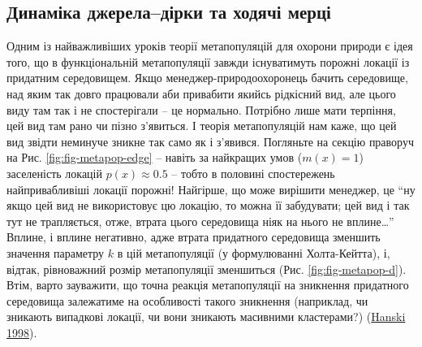 \documentclass[
  11pt,
]{book}
\begin{document}
\subsection{Динаміка джерела--дірки та ходячі мерці}\label{ux434ux438ux43dux430ux43cux456ux43aux430-ux434ux436ux435ux440ux435ux43bux430ux434ux456ux440ux43aux438-ux442ux430-ux445ux43eux434ux44fux447ux456-ux43cux435ux440ux446ux456}

Одним із найважливіших уроків теорії метапопуляцій для охорони природи є ідея того, що в функціональній метапопуляції завжди існуватимуть порожні локації із придатним середовищем. Якщо менеджер-природоохоронець бачить середовище, над яким так довго працювали аби привабити якийсь рідкісний вид, але цього виду там так і не спостерігали -- це нормально. Потрібно лише мати терпіння, цей вид там рано чи пізно з'явиться. І теорія метапопуляцій нам каже, що цей вид звідти неминуче зникне так само як і з'явився. Погляньте на секцію праворуч на Рис. \ref{fig:fig-metapop-edge} -- навіть за найкращих умов (\(m(x) = 1\)) заселеність локацій \(p(x) \approx 0.5\) -- тобто в половині спостережень найпривабливіші локації порожні! Найгірше, що може вирішити менеджер, це ``ну якщо цей вид не використовує цю локацію, то можна її забудувати; цей вид і так тут не трапляється, отже, втрата цього середовища ніяк на нього не вплине\ldots{}'' Вплине, і вплине негативно, адже втрата придатного середовища зменшить значення параметру \(k\) в цій метапопуляції (у формулюванні Холта-Кейтта), і, відтак, рівноважний розмір метапопуляції зменшиться (Рис. \ref{fig:fig-metapop-d}). Втім, варто зауважити, що точна реакція метапопуляції на зникнення придатного середовища залежатиме на особливості такого зникнення (наприклад, чи зникають випадкові локації, чи вони зникають масивними кластерами?) (\href{https://www.nature.com/articles/23876}{Hanski 1998}).
\end{document}
